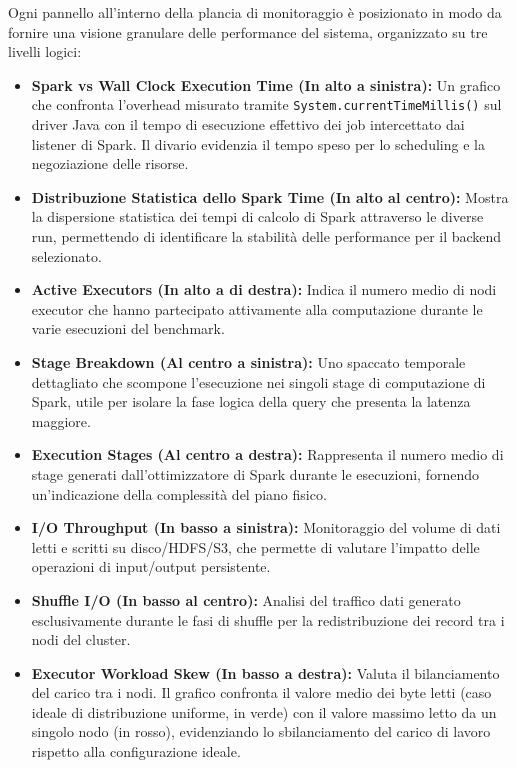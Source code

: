 \documentclass[conference]{IEEEtran}
\begin{document}
Ogni pannello all'interno della plancia di monitoraggio è posizionato in modo da fornire una visione granulare delle performance del sistema, organizzato su tre livelli logici:
\begin{itemize}
    \item \textbf{Spark vs Wall Clock Execution Time (In alto a sinistra):} Un grafico che confronta l'overhead misurato tramite \texttt{System.currentTimeMillis()} sul driver Java con il tempo di esecuzione effettivo dei job intercettato dai listener di Spark.
    Il divario evidenzia il tempo speso per lo scheduling e la negoziazione delle risorse.
    \item \textbf{Distribuzione Statistica dello Spark Time (In alto al centro):} Mostra la dispersione statistica dei tempi di calcolo di Spark attraverso le diverse run, permettendo di identificare la stabilità delle performance per il backend selezionato.
    \item \textbf{Active Executors (In alto a di destra):} Indica il numero medio di nodi executor che hanno partecipato attivamente alla computazione durante le varie esecuzioni del benchmark.
    \item \textbf{Stage Breakdown (Al centro a sinistra):} Uno spaccato temporale dettagliato che scompone l'esecuzione nei singoli stage di computazione di Spark, utile per isolare la fase logica della query che presenta la latenza maggiore.
    \item \textbf{Execution Stages (Al centro a destra):} Rappresenta il numero medio di stage generati dall'ottimizzatore di Spark durante le esecuzioni, fornendo un'indicazione della complessità del piano fisico.
    \item \textbf{I/O Throughput (In basso a sinistra):} Monitoraggio del volume di dati letti e scritti su disco/HDFS/S3, che permette di valutare l'impatto delle operazioni di input/output persistente.
    \item \textbf{Shuffle I/O (In basso al centro):} Analisi del traffico dati generato esclusivamente durante le fasi di shuffle per la redistribuzione dei record tra i nodi del cluster.
    \item \textbf{Executor Workload Skew (In basso a destra):} Valuta il bilanciamento del carico tra i nodi.
    Il grafico confronta il valore medio dei byte letti (caso ideale di distribuzione uniforme, in verde) con il valore massimo letto da un singolo nodo (in rosso), evidenziando lo sbilanciamento del carico di lavoro rispetto alla configurazione ideale.
\end{itemize}
\end{document}
